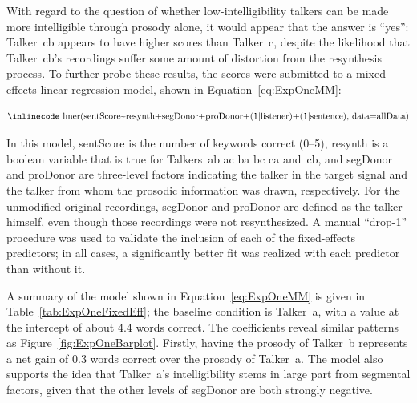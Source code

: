 With regard to the question of whether low-intelligibility talkers can be made more intelligible through prosody alone, it would appear that the answer is “yes”: Talker~\ac{cb} appears to have higher scores than Talker~\ac{c}, despite the likelihood that Talker~\ac{cb}’s recordings suffer some amount of distortion from the resynthesis process.  To further probe these results, the scores were submitted to a mixed-effects linear regression model, shown in Equation~\ref{eq:ExpOneMM}:

\begin{equation}\label{eq:ExpOneMM}
	\text{{\inlinecode lmer(sentScore\textasciitilde resynth+segDonor+proDonor+(1|listener)+(1|sentence), data=allData)}}
\end{equation}

In this model, {\inlinecode sentScore} is the number of keywords correct (0–5), {\inlinecode resynth} is a boolean variable that is true for Talkers~\ac{ab ac ba bc ca} and~\ac{cb}, and {\inlinecode segDonor} and {\inlinecode proDonor} are three-level factors indicating the talker in the target signal and the talker from whom the prosodic information was drawn, respectively.  For the unmodified original recordings, {\inlinecode segDonor} and {\inlinecode proDonor} are defined as the talker himself, even though those recordings were not resynthesized.  A manual “drop-1” procedure was used to validate the inclusion of each of the fixed-effects predictors; in all cases, a significantly better fit was realized with each predictor than without it.

A summary of the model shown in Equation~\ref{eq:ExpOneMM} is given in Table~\ref{tab:ExpOneFixedEff}; the baseline condition is Talker~\ac{a}, with a value at the intercept of about 4.4 words correct.  The coefficients reveal similar patterns as Figure~\ref{fig:ExpOneBarplot}.  Firstly, having the prosody of Talker~\ac{b} represents a net gain of 0.3 words correct over the prosody of Talker~\ac{a}.  The model also supports the idea that Talker~\ac{a}’s intelligibility stems in large part from segmental factors, given that the other levels of {\inlinecode segDonor} are both strongly negative.

